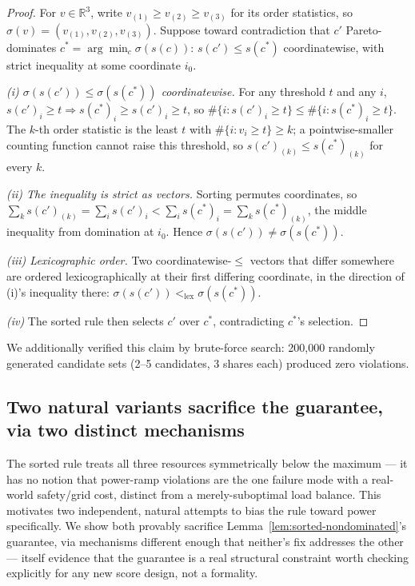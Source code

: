 \documentclass[sigconf,review,anonymous]{acmart}
\begin{document}
\begin{proof}
For $v \in \mathbb{R}^3$, write $v_{(1)} \ge v_{(2)} \ge v_{(3)}$ for its order statistics, so
$\sigma(v) = (v_{(1)}, v_{(2)}, v_{(3)})$. Suppose toward contradiction that $c'$
Pareto-dominates $c^* = \arg\min_c \sigma(s(c))$: $s(c') \le s(c^*)$ coordinatewise, with
strict inequality at some coordinate $i_0$.

\emph{(i) $\sigma(s(c')) \le \sigma(s(c^*))$ coordinatewise.} For any threshold $t$ and any
$i$, $s(c')_i \ge t \Rightarrow s(c^*)_i \ge s(c')_i \ge t$, so
$\#\{i : s(c')_i \ge t\} \le \#\{i : s(c^*)_i \ge t\}$. The $k$-th order statistic is the
least $t$ with $\#\{i : v_i \ge t\} \ge k$; a pointwise-smaller counting function cannot raise
this threshold, so $s(c')_{(k)} \le s(c^*)_{(k)}$ for every $k$.

\emph{(ii) The inequality is strict as vectors.} Sorting permutes coordinates, so
$\sum_k s(c')_{(k)} = \sum_i s(c')_i < \sum_i s(c^*)_i = \sum_k s(c^*)_{(k)}$, the middle
inequality from domination at $i_0$. Hence $\sigma(s(c')) \ne \sigma(s(c^*))$.

\emph{(iii) Lexicographic order.} Two coordinatewise-$\le$ vectors that differ somewhere are
ordered lexicographically at their first differing coordinate, in the direction of (i)'s
inequality there: $\sigma(s(c')) <_{\mathrm{lex}} \sigma(s(c^*))$.

\emph{(iv)} The sorted rule then selects $c'$ over $c^*$, contradicting $c^*$'s selection.
\end{proof}

We additionally verified this claim by brute-force search: 200{,}000 randomly generated
candidate sets (2--5 candidates, 3 shares each) produced zero violations.

\subsection{Two natural variants sacrifice the guarantee, via two distinct mechanisms}
\label{sec:counterexample}

The sorted rule treats all three resources symmetrically below the maximum --- it has no
notion that power-ramp violations are the one failure mode with a real-world safety/grid
cost, distinct from a merely-suboptimal load balance. This motivates two independent, natural
attempts to bias the rule toward power specifically. We show both provably sacrifice
Lemma~\ref{lem:sorted-nondominated}'s guarantee, via mechanisms different enough that
neither's fix addresses the other --- itself evidence that the guarantee is a real structural
constraint worth checking explicitly for any new score design, not a formality.
\end{document}
